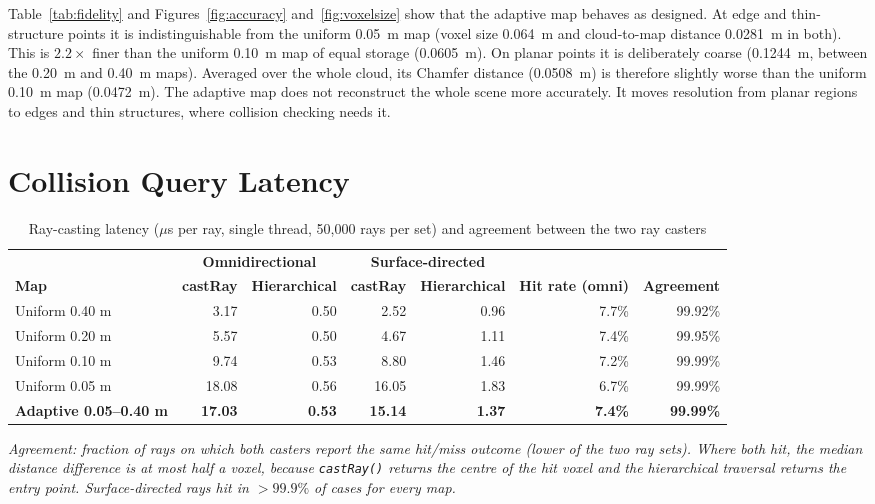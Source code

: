 \documentclass[11pt,a4paper]{report}
\begin{document}
Table~\ref{tab:fidelity} and Figures~\ref{fig:accuracy} and~\ref{fig:voxelsize} show that the adaptive map behaves as designed. At edge and thin-structure points it is indistinguishable from the uniform 0.05~m map (voxel size 0.064~m and cloud-to-map distance 0.0281~m in both). This is $2.2\times$ finer than the uniform 0.10~m map of equal storage (0.0605~m). On planar points it is deliberately coarse (0.1244~m, between the 0.20~m and 0.40~m maps). Averaged over the whole cloud, its Chamfer distance (0.0508~m) is therefore slightly worse than the uniform 0.10~m map (0.0472~m). The adaptive map does not reconstruct the whole scene more accurately. It moves resolution from planar regions to edges and thin structures, where collision checking needs it.

\section{Collision Query Latency}
\label{sec:rays}

\begin{table}[H]
    \centering
    \caption{Ray-casting latency ($\mu$s per ray, single thread, 50,000 rays per set) and agreement between the two ray casters}
    \label{tab:rays}
    \vspace{2mm}
    \small
    \setlength{\tabcolsep}{4pt}
    \begin{tabular}{lrrrrrr}
        \toprule
        & \multicolumn{2}{c}{\textbf{Omnidirectional}} & \multicolumn{2}{c}{\textbf{Surface-directed}} & & \\
        \cmidrule(lr){2-3} \cmidrule(lr){4-5}
        \textbf{Map} & \textbf{castRay} & \textbf{Hierarchical} & \textbf{castRay} & \textbf{Hierarchical} & \textbf{Hit rate (omni)} & \textbf{Agreement} \\
        \midrule
        Uniform 0.40 m & 3.17 & 0.50 & 2.52 & 0.96 & 7.7\% & 99.92\% \\
        Uniform 0.20 m & 5.57 & 0.50 & 4.67 & 1.11 & 7.4\% & 99.95\% \\
        Uniform 0.10 m & 9.74 & 0.53 & 8.80 & 1.46 & 7.2\% & 99.99\% \\
        Uniform 0.05 m & 18.08 & 0.56 & 16.05 & 1.83 & 6.7\% & 99.99\% \\
        \textbf{Adaptive 0.05--0.40 m} & \textbf{17.03} & \textbf{0.53} & \textbf{15.14} & \textbf{1.37} & \textbf{7.4\%} & \textbf{99.99\%} \\
        \bottomrule
    \end{tabular}
\end{table}
\noindent\textit{Agreement: fraction of rays on which both casters report the same hit/miss outcome (lower of the two ray sets). Where both hit, the median distance difference is at most half a voxel, because \texttt{castRay()} returns the centre of the hit voxel and the hierarchical traversal returns the entry point. Surface-directed rays hit in $>99.9\%$ of cases for every map.}
\end{document}
